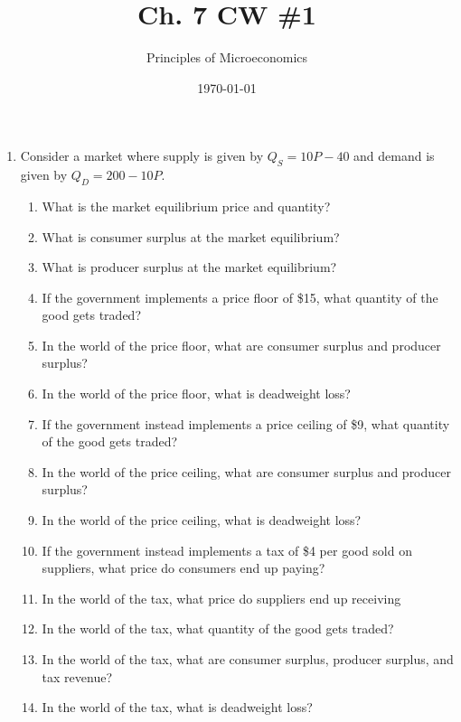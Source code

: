 \documentclass{article}
\title{Ch. 7 CW \#1}
\author{Principles of Microeconomics}
\date{\today}
\begin{document}
\maketitle

\begin{enumerate}

\item Consider a market where supply is given by $Q_S = 10P - 40$ and demand is given by $Q_D = 200 - 10P$.

	\begin{enumerate}
	
	\item What is the market equilibrium price and quantity?
	
	\item What is consumer surplus at the market equilibrium?
	
	\item What is producer surplus at the market equilibrium?
	
	\item If the government implements a price floor of \$15, what quantity of the good gets traded?
	
	\item In the world of the price floor, what are consumer surplus and producer surplus?
	
	\item In the world of the price floor, what is deadweight loss?
	
	\item If the government instead implements a price ceiling of \$9, what quantity of the good gets traded?
	
	\item In the world of the price ceiling, what are consumer surplus and producer surplus?
	
	\item In the world of the price ceiling, what is deadweight loss?
	
	\item If the government instead implements a tax of \$4 per good sold on suppliers, what price do consumers end up paying?
	
	\item In the world of the tax, what price do suppliers end up receiving
	
	\item In the world of the tax, what quantity of the good gets traded?
	
	\item In the world of the tax, what are consumer surplus, producer surplus, and tax revenue?
	
	\item In the world of the tax, what is deadweight loss?
	
	\end{enumerate}

\end{enumerate}
\end{document}
